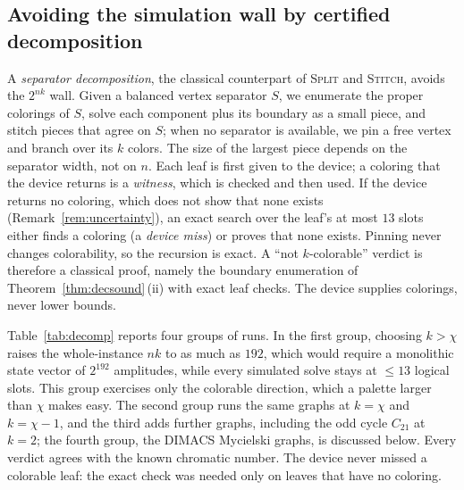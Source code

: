 \documentclass[a4paper,fleqn]{cas-sc}
\newcommand{\rn}[1]{\textup{\textsc{\footnotesize #1}}}
\begin{document}
\subsection{Avoiding the simulation wall by certified decomposition}
\label{sec:decomp}

A \emph{separator decomposition}, the classical counterpart of \rn{Split} and
\rn{Stitch}, avoids the $2^{nk}$ wall. Given a balanced vertex separator $S$, we
enumerate the proper colorings of $S$, solve each component plus its boundary as a
small piece, and stitch pieces that agree on $S$; when no separator is available, we
pin a free vertex and branch over its $k$ colors. The size of the largest piece
depends on the separator width, not on $n$. Each leaf is first given to the device; a
coloring that the device returns is a \emph{witness}, which is checked and then used.
If the device returns no coloring, which does not show that none exists
(Remark~\ref{rem:uncertainty}), an exact search over the leaf's at most $13$ slots
either finds a coloring (a \emph{device miss}) or proves that none exists. Pinning
never changes colorability, so the recursion is exact. A ``not $k$-colorable'' verdict
is therefore a classical proof, namely the boundary enumeration of
Theorem~\ref{thm:decsound}\,(ii) with exact leaf checks. The device supplies colorings,
never lower bounds.

Table~\ref{tab:decomp} reports four groups of runs. In the first group, choosing
$k>\chi$ raises the whole-instance $nk$ to as much as $192$, which would require a
monolithic state vector of $2^{192}$ amplitudes, while every simulated solve stays at
$\le13$ logical slots. This group exercises only the colorable direction, which a
palette larger than $\chi$ makes easy. The second group runs the same graphs at
$k=\chi$ and $k=\chi-1$, and the third adds further graphs, including the odd cycle
$C_{21}$ at $k=2$; the fourth group, the DIMACS Mycielski graphs, is discussed below.
Every verdict agrees with the known chromatic number. The device never missed a
colorable leaf: the exact check was needed only on leaves that have no coloring.
\end{document}
